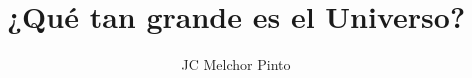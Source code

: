 \documentclass[12pt,addpoints,answers]{guia}
\title{¿Qué tan grande es el Universo?}
\author{JC Melchor Pinto}
\begin{document}
\INFO%
\begin{questions}
    \questionboxed[25]{}
    \questionboxed[25]{}
\end{questions}
\end{document}
